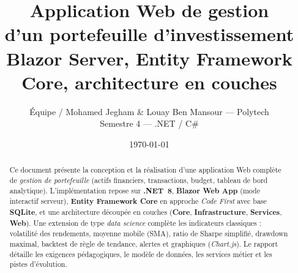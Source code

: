 \documentclass[11pt,a4paper]{report}
\title{\textbf{Application Web de gestion\\d'un portefeuille d'investissement}\\[0.5em]\large Blazor Server, Entity Framework Core, architecture en couches}
\author{Équipe / Mohamed Jegham & Louay Ben Mansour — Polytech\\Semestre 4 — .NET / C\#}
\date{\today}
\begin{document}
\maketitle
\thispagestyle{empty}

\begin{abstract}
\noindent
Ce document présente la conception et la réalisation d'une application Web complète de \emph{gestion de portefeuille} (actifs financiers, transactions, budget, tableau de bord analytique). L'implémentation repose sur \textbf{.NET~8}, \textbf{Blazor Web App} (mode interactif serveur), \textbf{Entity Framework Core} en approche \emph{Code First} avec base \textbf{SQLite}, et une architecture découpée en couches (\textbf{Core}, \textbf{Infrastructure}, \textbf{Services}, \textbf{Web}). Une extension de type \emph{data science} complète les indicateurs classiques : volatilité des rendements, moyenne mobile (SMA), ratio de Sharpe simplifié, drawdown maximal, backtest de règle de tendance, alertes et graphiques (\emph{Chart.js}). Le rapport détaille les exigences pédagogiques, le modèle de données, les services métier et les pistes d'évolution.
\end{abstract}

\tableofcontents
\clearpage











\appendix


\end{document}
